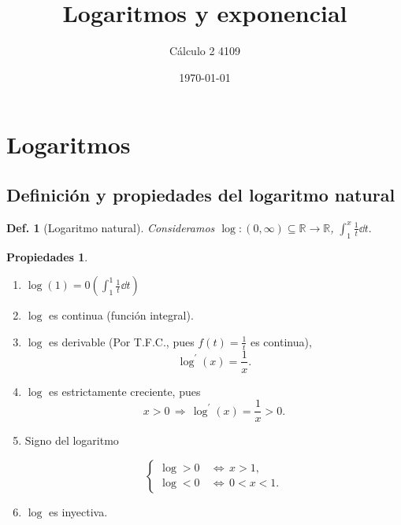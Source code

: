 \documentclass{article}
\title{\Huge{Logaritmos y exponencial}}
\author{Cálculo 2 4109}
\date{\today}
\theoremstyle{definicion}
\newtheorem{definicion}{Def.}
\theoremstyle{definition}             %
\theoremstyle{definition}             %
\theoremstyle{definition}
\theoremstyle{definition}
\newtheorem{properties}{Propiedades}
\theoremstyle{observacion}
\theoremstyle{definition}
\theoremstyle{plain}
\theoremstyle{definition}
\theoremstyle{afirmacion}
\theoremstyle{definition}
\begin{document}
    \maketitle

    \section{Logaritmos}
    \subsection{Definición y propiedades del logaritmo natural}

    \begin{definicion}[Logaritmo natural]   
        Consideramos \(\log \colon (0, \infty) \subseteq \mathbb{R} \to \mathbb{R}\), \(\int_{1}^{x}\frac{1}{t}\dd{t}.\)
    \end{definicion}

    \begin{properties}
        \vphantom{adfslfjsdlfjdslajfakjfkdlsjfakjfljdaskfjlasdjflkasjfdkajd}
        \begin{enumerate}[label = \roman*)]
            \item \(\log(1) = 0 (\int_{1}^{1}\frac{1}{t}\dd{t})\)
            \item \(\log\) es continua (función integral).
            \item \(\log\) es derivable (Por T.F.C., pues \(f(t) = \frac{1}{t}\) es continua),
                \begin{equation*}
                    \log^{\prime}(x) = \dfrac{1}{x}.        
                \end{equation*}
            \item \(\log\) es estrictamente creciente, pues 
                \begin{equation*}
                    x > 0\, \Rightarrow\, \log^{\prime}(x) = \dfrac{1}{x} > 0.
                \end{equation*}
            
            \item Signo del logaritmo 
            
                \begin{equation*}
                    \begin{cases}
                        \log > 0\, &\Leftrightarrow\, x > 1,\\
                        \log < 0\, &\Leftrightarrow\, 0 < x < 1.
                    \end{cases}
                \end{equation*}

            \item \(\log\) es inyectiva.
        \end{enumerate}
    \end{properties}
\end{document}
